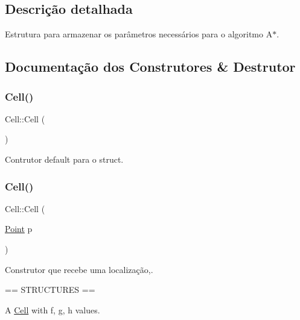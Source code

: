 \subsection{Descrição detalhada}
Estrutura para armazenar os parâmetros necessários para o algoritmo A$\ast$. 

\subsection{Documentação dos Construtores \& Destrutor}
\mbox{\label{structCell_a8a4b210b76ae4387021b2632d0c5c3c1}} 
\subsubsection{\texorpdfstring{Cell()}{Cell()}\hspace{0.1cm}{\footnotesize\ttfamily [1/3]}}
{\footnotesize\ttfamily Cell\+::\+Cell (\begin{DoxyParamCaption}{ }\end{DoxyParamCaption})\hspace{0.3cm}{\ttfamily [default]}}



Contrutor default para o struct. 

\mbox{\label{structCell_aeebfbd5f1dc0312e3687361b9ae87f72}} 
\subsubsection{\texorpdfstring{Cell()}{Cell()}\hspace{0.1cm}{\footnotesize\ttfamily [2/3]}}
{\footnotesize\ttfamily Cell\+::\+Cell (\begin{DoxyParamCaption}\item[{\hyperlink{structPoint}{Point}}]{p }\end{DoxyParamCaption})}



Construtor que recebe uma localização,. 

== S\+T\+R\+U\+C\+T\+U\+R\+ES ==

A \hyperlink{structCell}{Cell} with \textquotesingle{}f\textquotesingle{}, \textquotesingle{}g\textquotesingle{}, \textquotesingle{}h\textquotesingle{} values. \mbox{\label{structCell_a311ac48a496fd17ba0059983ea3bd351}} 
